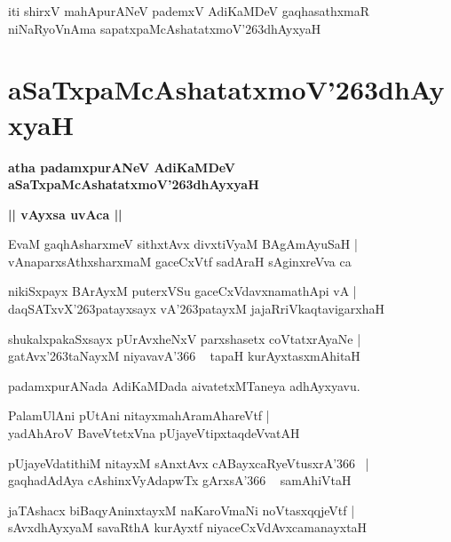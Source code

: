 \documentclass[twoside,12pt,openright]{book}
\def\S{\char'263}
\newcounter{shloka}[chapter]
\def\uvaca#1{\centerline{{\large\textbf{#1}}}}
\begin{document}
\begin{center}
iti shirxV mahApurANeV pademxV AdiKaMDeV gaqhasathxmaR niNaRyoVnAma sapatxpaMcAshatatxmoV\S dhAyxyaH
\end{center}

\chapter{aSaTxpaMcAshatatxmoV\S dhAyxyaH}

\begin{center}
{\LARGE\bfseries atha padamxpurANeV AdiKaMDeV aSaTxpaMcAshatatxmoV\S dhAyxyaH}
\end{center}

\uvaca{|| vAyxsa uvAca ||}

\begin{shloka}
EvaM gaqhAsharxmeV sithxtAvx divxtiVyaM BAgAmAyuSaH |\\
vAnaparxsAthxsharxmaM gaceCxVtf sadAraH sAginxreVva ca 
\end{shloka}

\begin{shloka}
nikiSxpayx BArAyxM puterxVSu gaceCxVdavxnamathApi vA |\\
daqSATxvX\S patayxsayx vA\S patayxM jajaRriVkaqtavigarxhaH
\end{shloka}

\begin{shloka}
shukalxpakaSxsayx pUrAvxheNxV parxshasetx coVtatxrAyaNe |\\
gatAvx\S taNayxM niyavavA\char'366 ~ tapaH kurAyxtasxmAhitaH 
\end{shloka}

\begin{center}
padamxpurANada AdiKaMDada aivatetxMTaneya adhAyxyavu.
\end{center}

\begin{shloka}
PalamUlAni pUtAni nitayxmahAramAhareVtf |\\
yadAhAroV BaveVtetxVna pUjayeVtipxtaqdeVvatAH 
\end{shloka}

\begin{shloka}
pUjayeVdatithiM nitayxM sAnxtAvx cABayxcaRyeVtusxrA\char'366 ~|\\
gaqhadAdAya cAshinxVyAdapwTx gArxsA\char'366 ~ samAhiVtaH 
\end{shloka}

\begin{shloka}
jaTAshacx biBaqyAninxtayxM naKaroVmaNi noVtasxqqjeVtf |\\
sAvxdhAyxyaM savaRthA kurAyxtf niyaceCxVdAvxcamanayxtaH 
\end{shloka}
\end{document}
